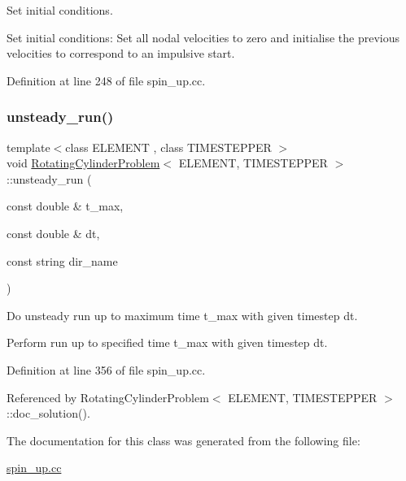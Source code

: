 Set initial conditions. 

Set initial conditions\+: Set all nodal velocities to zero and initialise the previous velocities to correspond to an impulsive start. 

Definition at line 248 of file spin\+\_\+up.\+cc.

\mbox{\label{classRotatingCylinderProblem_abfb7f77b97e9ac061edbaa97a018cd24}} 
\subsubsection{\texorpdfstring{unsteady\+\_\+run()}{unsteady\_run()}}
{\footnotesize\ttfamily template$<$class E\+L\+E\+M\+E\+NT , class T\+I\+M\+E\+S\+T\+E\+P\+P\+ER $>$ \\
void \hyperlink{classRotatingCylinderProblem}{Rotating\+Cylinder\+Problem}$<$ E\+L\+E\+M\+E\+NT, T\+I\+M\+E\+S\+T\+E\+P\+P\+ER $>$\+::unsteady\+\_\+run (\begin{DoxyParamCaption}\item[{const double \&}]{t\+\_\+max,  }\item[{const double \&}]{dt,  }\item[{const string}]{dir\+\_\+name }\end{DoxyParamCaption})}



Do unsteady run up to maximum time t\+\_\+max with given timestep dt. 

Perform run up to specified time t\+\_\+max with given timestep dt. 

Definition at line 356 of file spin\+\_\+up.\+cc.



Referenced by Rotating\+Cylinder\+Problem$<$ E\+L\+E\+M\+E\+N\+T, T\+I\+M\+E\+S\+T\+E\+P\+P\+E\+R $>$\+::doc\+\_\+solution().



The documentation for this class was generated from the following file\+:\begin{DoxyCompactItemize}
\item 
\hyperlink{spin__up_8cc}{spin\+\_\+up.\+cc}\end{DoxyCompactItemize}
